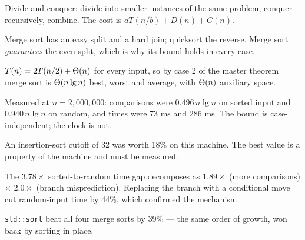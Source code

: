 \begin{chaptersummary}
\begin{tight}
  \item Divide and conquer: divide into smaller instances of the same problem,
        conquer recursively, combine. The cost is $aT(n/b) + D(n) + C(n)$.
  \item Merge sort has an easy split and a hard join; quicksort the reverse.
        Merge sort \emph{guarantees} the even split, which is why its bound
        holds in every case.
  \item $T(n) = 2T(n/2) + \Theta(n)$ for every input, so by case 2 of the
        master theorem merge sort is $\Theta(n\operatorname{lg} n)$ best, worst and average,
        with $\Theta(n)$ auxiliary space.
  \item Measured at $n = 2{,}000{,}000$: comparisons were $0.496\,n\lg n$ on
        sorted input and $0.940\,n\lg n$ on random, and times were 73 ms and
        286 ms. The bound is case-independent; the clock is not.
  \item An insertion-sort cutoff of 32 was worth 18\% on this machine. The best
        value is a property of the machine and must be measured.
  \item The $3.78\times$ sorted-to-random time gap decomposes as $1.89\times$
        (more comparisons) $\times$ $2.0\times$ (branch misprediction).
        Replacing the branch with a conditional move cut random-input time by
        44\%, which confirmed the mechanism.
  \item \texttt{std::sort} beat all four merge sorts by 39\% --- the same order
        of growth, won back by sorting in place.
\end{tight}
\end{chaptersummary}

